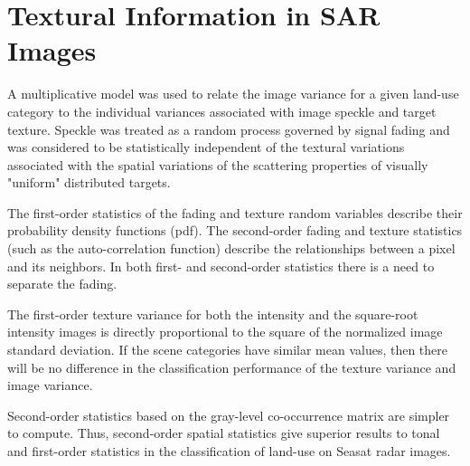 \documentclass[paper=a4, fontsize=11pt]{scrartcl}
\begin{document}
\newpage

\section*{\textcolor{VioletRed4}{Textural Information in SAR Images}}

A multiplicative model was used to relate the image variance for a given land-use category to the individual variances associated with image speckle and target texture. 
Speckle was treated as a random process governed by signal fading and was considered to be statistically independent of the textural variations associated with the spatial variations of the scattering properties of visually "uniform" distributed targets.

The first-order statistics of the fading and texture random variables describe their probability density functions (pdf). 
The second-order fading and texture statistics (such as the auto-correlation function) describe the relationships between a pixel and its neighbors. 
In both first- and second-order statistics there is a need to separate the fading.

The first-order texture variance for both the intensity and the square-root intensity images is directly proportional to the square of the normalized image standard deviation. 
If the scene categories have similar mean values, then there will be no difference in the classification performance of the texture
variance and image variance.

Second-order statistics based on the gray-level co-occurrence matrix are simpler to compute. 
Thus, second-order spatial statistics give superior results to tonal and first-order statistics in the classification of land-use on Seasat radar images.
\end{document}
